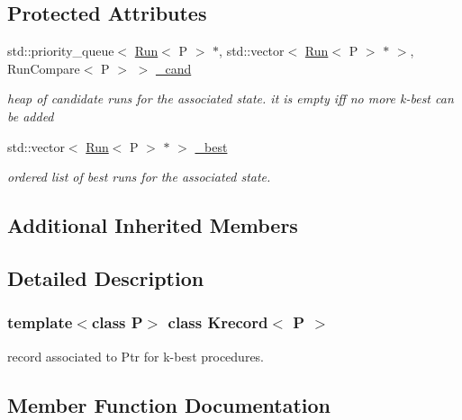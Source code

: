 \subsection*{Protected Attributes}
\begin{DoxyCompactItemize}
\item 
\mbox{\label{classKrecord_a4bd6f869776d942976f6469aebc64f10}} 
std\+::priority\+\_\+queue$<$ \mbox{\hyperlink{classRun}{Run}}$<$ P $>$ $\ast$, std\+::vector$<$ \mbox{\hyperlink{classRun}{Run}}$<$ P $>$ $\ast$ $>$, Run\+Compare$<$ P $>$ $>$ \mbox{\hyperlink{classKrecord_a4bd6f869776d942976f6469aebc64f10}{\+\_\+cand}}
\begin{DoxyCompactList}\small\item\em heap of candidate runs for the associated state. it is empty iff no more k-\/best can be added \end{DoxyCompactList}\item 
\mbox{\label{classKrecord_a2974d287d3c849f4c9f5b03f51e7159c}} 
std\+::vector$<$ \mbox{\hyperlink{classRun}{Run}}$<$ P $>$ $\ast$ $>$ \mbox{\hyperlink{classKrecord_a2974d287d3c849f4c9f5b03f51e7159c}{\+\_\+best}}
\begin{DoxyCompactList}\small\item\em ordered list of best runs for the associated state. \end{DoxyCompactList}\end{DoxyCompactItemize}
\subsection*{Additional Inherited Members}


\subsection{Detailed Description}
\subsubsection*{template$<$class P$>$\newline
class Krecord$<$ P $>$}

record associated to Ptr for k-\/best procedures. 

\subsection{Member Function Documentation}
\mbox{\label{classKrecord_ae88ed30977296575c7b60eab0138bbb1}} 
